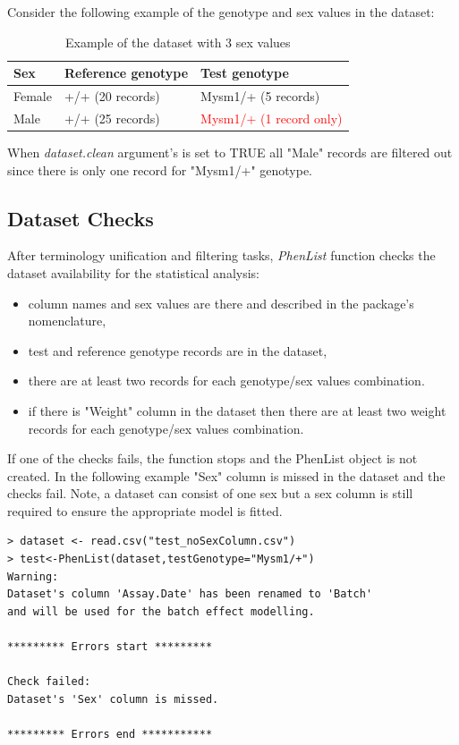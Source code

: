 \documentclass[12pt,a4paper]{article}
\begin{document}
Consider the following example of the genotype and sex values in the dataset:
\begin{table}[!h]
\begin{center}
\begin{tabular}{| l | l | l | }
  \hline
Sex&Reference genotype&Test genotype\\\hline
Female&+\slash + (20 records)&Mysm1\slash + (5 records)\\
Male&+\slash + (25 records)&\textcolor{red}{Mysm1\slash + (1 record only)} \\
\hline  
\end{tabular}
\caption{Example of the dataset with 3 sex values}\label{table:04}
\end{center}
\end{table}

When \textit{dataset.clean} argument's is set to TRUE all "Male" records are filtered out since there is only one record for "Mysm1\slash +" genotype.

\subsection{Dataset Checks}
\label{section:DatasetChecks}
After terminology unification and filtering tasks, \textit{PhenList} function checks the dataset availability for the statistical analysis: 
\begin{itemize}
\item column names and sex values are there and described in the package's nomenclature, 
\item test and reference genotype records are in the dataset, 
\item there are at least two records for each genotype\slash sex values combination.
\item if there is "Weight" column in the dataset then there are at least two weight records for each genotype\slash sex values combination.
\end{itemize}If one of the checks fails, the function stops and the PhenList object is not created. In the following example "Sex" column is missed in the dataset and the checks fail. 
Note, a dataset can consist of one sex but a sex column is still required to ensure the appropriate model is fitted.


\begingroup
    \fontsize{8pt}{12pt}\selectfont
\begin{verbatim}
> dataset <- read.csv("test_noSexColumn.csv")
> test<-PhenList(dataset,testGenotype="Mysm1/+")
Warning:
Dataset's column 'Assay.Date' has been renamed to 'Batch' 
and will be used for the batch effect modelling.

********* Errors start *********

Check failed:
Dataset's 'Sex' column is missed.

********* Errors end ***********
\end{verbatim}
\endgroup
\end{document}
